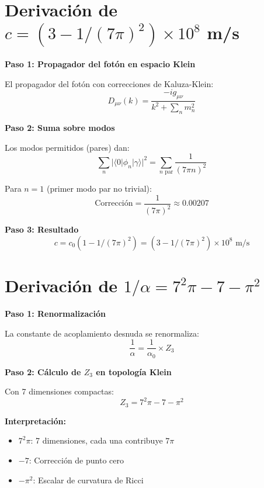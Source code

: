 \documentclass[12pt,a4paper,openany]{book}
\begin{document}
\section{Derivación de $c = (3 - 1/(7\pi)^2) \times 10^8$ m/s}

\textbf{Paso 1: Propagador del fotón en espacio Klein}

El propagador del fotón con correcciones de Kaluza-Klein:
\begin{equation}
    D_{\mu\nu}(k) = \frac{-ig_{\mu\nu}}{k^2 + \sum_n m_n^2}
\end{equation}

\textbf{Paso 2: Suma sobre modos}

Los modos permitidos (pares) dan:
\begin{equation}
    \sum_n |\langle 0|\phi_n|\gamma\rangle|^2 = \sum_{n \text{ par}} \frac{1}{(7\pi n)^2}
\end{equation}

Para $n=1$ (primer modo par no trivial):
\begin{equation}
    \text{Corrección} = \frac{1}{(7\pi)^2} \approx 0.00207
\end{equation}

\textbf{Paso 3: Resultado}
\begin{equation}
    c = c_0(1 - 1/(7\pi)^2) = (3 - 1/(7\pi)^2) \times 10^8 \text{ m/s}
\end{equation}

\section{Derivación de $1/\alpha = 7^2\pi - 7 - \pi^2$}

\textbf{Paso 1: Renormalización}

La constante de acoplamiento desnuda se renormaliza:
\begin{equation}
    \frac{1}{\alpha} = \frac{1}{\alpha_0} \times Z_3
\end{equation}

\textbf{Paso 2: Cálculo de $Z_3$ en topología Klein}

Con 7 dimensiones compactas:
\begin{equation}
    Z_3 = 7^2\pi - 7 - \pi^2
\end{equation}

\textbf{Interpretación:}
\begin{itemize}
    \item $7^2\pi$: 7 dimensiones, cada una contribuye $7\pi$
    \item $-7$: Corrección de punto cero
    \item $-\pi^2$: Escalar de curvatura de Ricci
\end{itemize}
\end{document}
